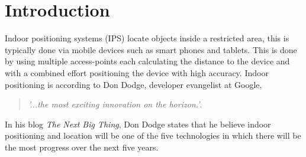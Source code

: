 \chapter{Introduction}
Indoor positioning systems (IPS) locate objects inside a restricted area, this is typically done via mobile devices such as smart phones and tablets. This is done by using multiple access-points each calculating the distance to the device and with a combined effort positioning the device with high accuracy\cite{WhatIsIPS}. 
Indoor positioning is according to Don Dodge, developer evangelist at Google, 
\begin{quotation}
	\textit{'...the most exciting innovation on the horizon.'}\cite{DonDNextBigThing}.
\end{quotation}

In his blog \textit{The Next Big Thing}, Don Dodge states that he believe indoor positioning and location will be one of the five technologies in which there will be the most progress over the next five years\cite{DonDIndoorIsNext}.


